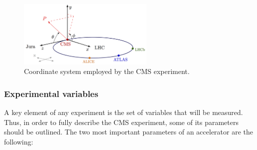 \begin{figure}
    \centering
    \includegraphics[width = 0.58\textwidth]{images/cms_coordinate_system.png}
    \caption{Coordinate system employed by the CMS experiment.}
    \label{fig:coordinate_sys}
\end{figure}

\subsubsection*{Experimental variables}
A key element of any experiment is the set of variables that will be measured. Thus, in order to fully describe the CMS experiment, some of its parameters should be outlined. The two most important parameters of an accelerator are the following:
